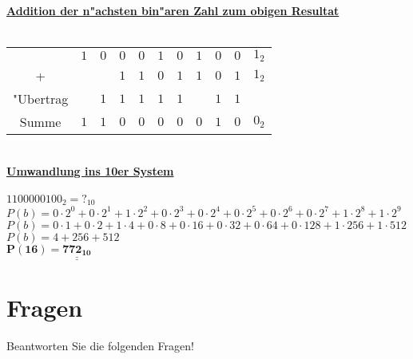 \documentclass[a4paper,10pt]{article}
\def\doubleunderline#1{\underline{\underline{#1}}}
\begin{document}
\begin{enumerate}
{		 \textbf{\underline{Addition der n"achsten bin"aren Zahl zum obigen Resultat}} \\
		 \\
		 \begin{tabular}{c@{\,}c@{\,}c@{\,}c@{\,}c@{\,}c@{\,}c@{\,}c@{\,}c@{\,}c@{\,}c}
		& $1$ & $0$ & $0$ & $0$ & $1$ & $0$ & $1$ & $0$ & $0$ & $1_{2}$ \\
		+ & & & $1$ & $1$ & $0$& $1$ & $1$ & $0$ & $1$ & $1_{2}$ \\
		\hline
		"Ubertrag  & & $1$ & $1$ & $1$ & $1$ & $1$ & & $1$ & $1$  &  \\
		\hline
		Summe & $1$ & $1$ & $0$ & $0$ & $0$ & $0$ & $0$ & $1$ & $0$ & $0_{2}$ \\
		\hline
		\hline		
		\end{tabular}
		\vspace{4mm}		
		\\
		 \textbf{\underline{Umwandlung ins 10er System}} \\
		 \\
	 	 $1100000100_{2} = ?_{10}$ \\
		 $P(b)= 0 \cdot 2^0 + 0 \cdot 2^1 + 1 \cdot 2^2 + 0 \cdot 2^3 + 0 \cdot 2^4 + 0 \cdot 2^5 + 0 \cdot 2^6 + 0 \cdot 2^7 + 1 \cdot 2^8 + 1 \cdot 2^9$ \\
		 $P(b)= 0 \cdot 1 + 0 \cdot 2 + 1 \cdot 4 + 0 \cdot 8 + 0 \cdot 16 + 0 \cdot 32 + 0 \cdot 64 + 0 \cdot 128 + 1 \cdot 256 + 1 \cdot 512$ \\
		 $P(b)= 4 + 256 + 512 $ \\
		 $\mathbf{P(16)= \doubleunderline{772_{10}}}$ \\			 
	 }

\end{enumerate}


\section{Fragen}

Beantworten Sie die folgenden Fragen!
\end{document}
